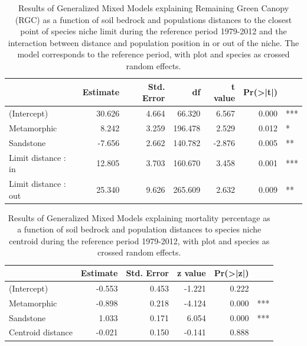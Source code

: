 \documentclass[11pt,twoside]{reedthesis}
\begin{document}
\begin{table}[H]

\caption[Results of Generalized Mixed Models explaining Remaining Green Canopy (RGC) as a function of distances to species niche limit.]{\label{tab:unnamed-chunk-28}Results of Generalized Mixed Models explaining Remaining Green Canopy (RGC) as a function of soil bedrock and populations distances to the closest point of species niche limit during the reference period 1979-2012 and the interaction between distance and population position in or out of the niche. The model corresponds to the reference period, with plot and species as crossed random effects.}
\centering
\fontsize{8}{10}\selectfont
\begin{tabular}[t]{lrrrrrl}
\toprule
 & Estimate & Std. Error & df & t value & Pr(>|t|) & \\
\midrule
(Intercept) & 30.626 & 4.664 & 66.320 & 6.567 & 0.000 & ***\\
Metamorphic & 8.242 & 3.259 & 196.478 & 2.529 & 0.012 & *\\
Sandstone & -7.656 & 2.662 & 140.782 & -2.876 & 0.005 & **\\
Limit distance : in & 12.805 & 3.703 & 160.670 & 3.458 & 0.001 & ***\\
Limit distance : out & 25.340 & 9.626 & 265.609 & 2.632 & 0.009 & **\\
\bottomrule
\end{tabular}
\end{table}
\begin{table}[H]

\caption[Results of Generalized Mixed Models explaining mortality percentage as a function of distances to species niche centroid.]{\label{tab:unnamed-chunk-29}Results of Generalized Mixed Models explaining mortality percentage as a function of soil bedrock and population distances to species niche centroid during the reference period 1979-2012, with plot and species as crossed random effects.}
\centering
\fontsize{8}{10}\selectfont
\begin{tabular}[t]{lrrrrl}
\toprule
 & Estimate & Std. Error & z value & Pr(>|z|) & \\
\midrule
(Intercept) & -0.553 & 0.453 & -1.221 & 0.222 & \\
Metamorphic & -0.898 & 0.218 & -4.124 & 0.000 & ***\\
Sandstone & 1.033 & 0.171 & 6.054 & 0.000 & ***\\
Centroid distance & -0.021 & 0.150 & -0.141 & 0.888 & \\
\bottomrule
\end{tabular}
\end{table}
\end{document}
